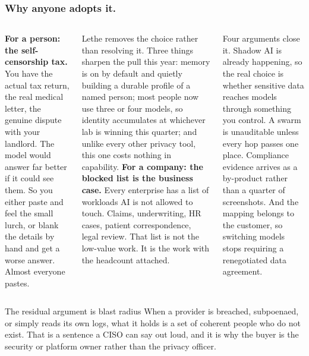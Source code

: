 \documentclass[aspectratio=169,10pt]{beamer}
\newcommand{\slideeyebrow}{}
\newcommand{\slide}[2]{\renewcommand{\slideeyebrow}{#1}\frametitle{#2}}
\begin{document}
\begin{frame}[shrink=20]
\slide{08}{Why anyone adopts it.}
\begin{columns}[T]
\textbf{For a person: the self-censorship tax.} You have the actual tax return, the real medical letter, the genuine dispute with your landlord. The model would answer far better if it could see them. So you either paste and feel the small lurch, or blank the details by hand and get a worse answer. Almost everyone pastes.
\vspace{2mm}

Lethe removes the choice rather than resolving it. Three things sharpen the pull this year: memory is on by default and quietly building a durable profile of a named person; most people now use three or four models, so identity accumulates at whichever lab is winning this quarter; and unlike every other privacy tool, this one costs nothing in capability.
\textbf{For a company: the blocked list is the business case.} Every enterprise has a list of workloads AI is not allowed to touch. Claims, underwriting, HR cases, patient correspondence, legal review. That list is not the low-value work. It is the work with the headcount attached.
\vspace{2mm}

Four arguments close it. Shadow AI is already happening, so the real choice is whether sensitive data reaches models through something you control. A swarm is unauditable unless every hop passes one place. Compliance evidence arrives as a by-product rather than a quarter of screenshots. And the mapping belongs to the customer, so switching models stops requiring a renegotiated data agreement.
\end{columns}
\vspace{3mm}
\begin{callout}{The residual argument is blast radius}
When a provider is breached, subpoenaed, or simply reads its own logs, what it holds is a set of coherent people who do not exist. That is a sentence a CISO can say out loud, and it is why the buyer is the security or platform owner rather than the privacy officer.
\end{callout}
\end{frame}
\end{document}
